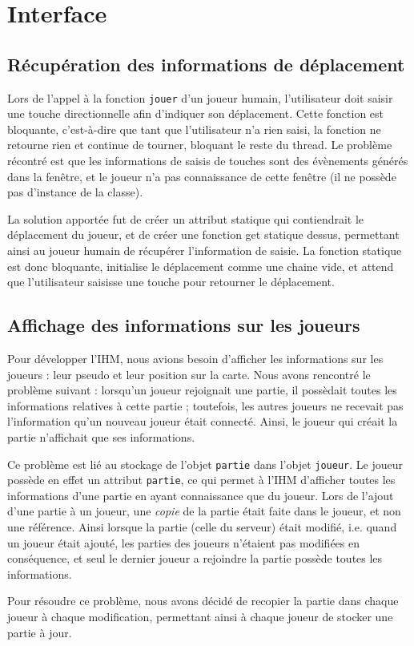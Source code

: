 \section{Interface}
    \subsection{Récupération des informations de déplacement}
        Lors de l'appel à la fonction \verb|jouer| d'un joueur humain, l'utilisateur doit saisir une touche directionnelle afin d'indiquer son déplacement. Cette fonction est bloquante, c'est-à-dire que tant que l'utilisateur n'a rien saisi, la fonction ne retourne rien et continue de tourner, bloquant le reste du thread. Le problème récontré est que les informations de saisis de touches sont des évènements générés dans la fenêtre, et le joueur n'a pas connaissance de cette fenêtre (il ne possède pas d'instance de la classe).

        La solution apportée fut de créer un attribut statique qui contiendrait le déplacement du joueur, et de créer une fonction get statique dessus, permettant ainsi au joueur humain de récupérer l'information de saisie. La fonction statique est donc bloquante, initialise le déplacement comme une chaine vide, et attend que l'utilisateur saisisse une touche pour retourner le déplacement.

    \subsection{Affichage des informations sur les joueurs}
        Pour développer l'IHM, nous avions besoin d'afficher les informations sur les joueurs : leur pseudo et leur position sur la carte. Nous avons rencontré le problème suivant : lorsqu'un joueur rejoignait une partie, il possèdait toutes les informations relatives à cette partie ; toutefois, les autres joueurs ne recevait pas l'information qu'un nouveau joueur était connecté. Ainsi, le joueur qui créait la partie n'affichait que ses informations.

        Ce problème est lié au stockage de l'objet \verb|partie| dans l'objet \verb|joueur|. Le joueur possède en effet un attribut \verb|partie|, ce qui permet à l'IHM d'afficher toutes les informations d'une partie en ayant connaissance que du joueur. Lors de l'ajout d'une partie à un joueur, une \emph{copie} de la partie était faite dans le joueur, et non une référence. Ainsi lorsque la partie (celle du serveur) était modifié, i.e. quand un joueur était ajouté, les parties des joueurs n'étaient pas modifiées en conséquence, et seul le dernier joueur a rejoindre la partie possède toutes les informations.

        Pour résoudre ce problème, nous avons décidé de recopier la partie dans chaque joueur à chaque modification, permettant ainsi à chaque joueur de stocker une partie à jour.
